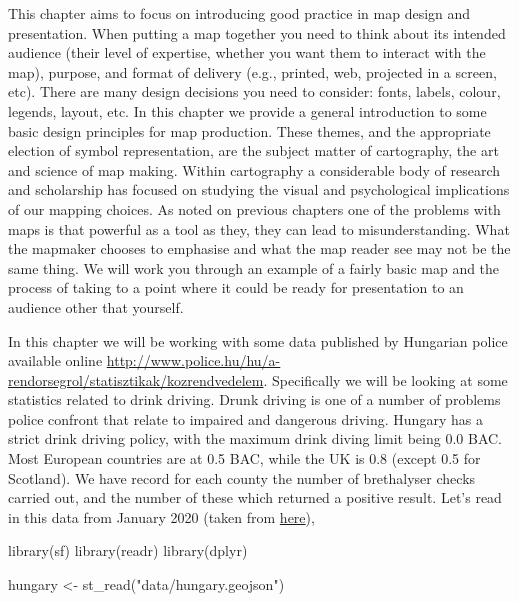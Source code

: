 \documentclass[
]{book}
\newenvironment{Shaded}{\begin{snugshade}}{\end{snugshade}}
\newcommand{\FunctionTok}[1]{\textcolor[rgb]{0.00,0.00,0.00}{#1}}
\newcommand{\NormalTok}[1]{#1}
\newcommand{\OtherTok}[1]{\textcolor[rgb]{0.56,0.35,0.01}{#1}}
\newcommand{\StringTok}[1]{\textcolor[rgb]{0.31,0.60,0.02}{#1}}
\begin{document}
This chapter aims to focus on introducing good practice in map design and presentation. When putting a map together you need to think about its intended audience (their level of expertise, whether you want them to interact with the map), purpose, and format of delivery (e.g., printed, web, projected in a screen, etc). There are many design decisions you need to consider: fonts, labels, colour, legends, layout, etc. In this chapter we provide a general introduction to some basic design principles for map production. These themes, and the appropriate election of symbol representation, are the subject matter of cartography, the art and science of map making. Within cartography a considerable body of research and scholarship has focused on studying the visual and psychological implications of our mapping choices. As noted on previous chapters one of the problems with maps is that powerful as a tool as they, they can lead to misunderstanding. What the mapmaker chooses to emphasise and what the map reader see may not be the same thing. We will work you through an example of a fairly basic map and the process of taking to a point where it could be ready for presentation to an audience other that yourself.

In this chapter we will be working with some data published by Hungarian police available online \url{http://www.police.hu/hu/a-rendorsegrol/statisztikak/kozrendvedelem}. Specifically we will be looking at some statistics related to drink driving. Drunk driving is one of a number of problems police confront that relate to impaired and dangerous driving. Hungary has a strict drink driving policy, with the maximum drink diving limit being 0.0 BAC. Most European countries are at 0.5 BAC, while the UK is 0.8 (except 0.5 for Scotland). We have record for each county the number of brethalyser checks carried out, and the number of these which returned a positive result. Let's read in this data from January 2020 (taken from \href{http://www.police.hu/sites/default/files/Kozrendvedelem\%20SK\%202021_01.pdf}{here}),

\begin{Shaded}
\begin{Highlighting}[]
\FunctionTok{library}\NormalTok{(sf)}
\FunctionTok{library}\NormalTok{(readr)}
\FunctionTok{library}\NormalTok{(dplyr)}



\NormalTok{hungary }\OtherTok{\textless{}{-}} \FunctionTok{st\_read}\NormalTok{(}\StringTok{"data/hungary.geojson"}\NormalTok{)}
\end{Highlighting}
\end{Shaded}
\end{document}
